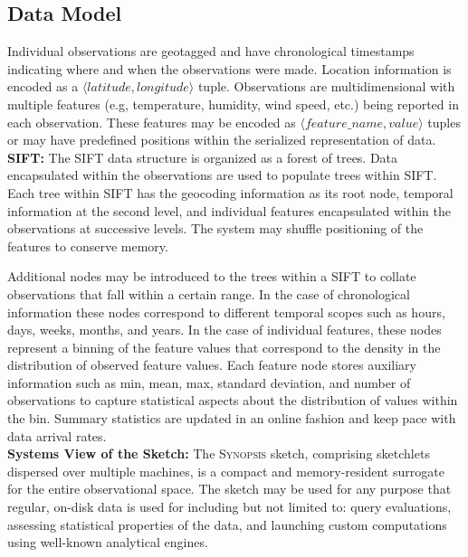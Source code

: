 \subsection{Data Model}
Individual observations are geotagged and have chronological timestamps indicating where and when the observations were made. Location information is encoded as a $\langle latitude, longitude \rangle$ tuple. Observations are multidimensional with multiple features (e.g, temperature, humidity, wind speed, etc.) being reported in each observation. These features may be encoded as $\langle feature\_name, value \rangle$ tuples or may have predefined positions within the serialized representation of data. 
\vspace{0.5em} \\
\textbf{SIFT:} The SIFT data structure is organized as a forest of trees. Data encapsulated within the observations are used to populate trees within SIFT. Each tree within SIFT has the geocoding information as its root node, temporal information at the second level, and individual features encapsulated within the observations at successive levels. The system may shuffle positioning of the features to conserve memory.

Additional nodes may be introduced to the trees within a SIFT to collate observations that fall within a certain range. In the case of chronological information these nodes correspond to different temporal scopes such as hours, days, weeks, months, and years. In the case of individual features, these nodes represent a binning of the feature values that correspond to the density in the distribution of observed feature values. Each feature node stores auxiliary information such as min, mean, max, standard deviation, and number of observations to capture statistical aspects about the distribution of values within the bin. Summary statistics are updated in an online fashion and keep pace with data arrival rates.
%
\vspace{0.5em} \\
\textbf{Systems View of the Sketch:} The \textsc{Synopsis} sketch, comprising sketchlets dispersed over multiple machines, is a compact and memory-resident surrogate for the entire observational space. The sketch may be used for any purpose that regular, on-disk data is used for including but not limited to: query evaluations, assessing statistical properties of the data, and launching custom computations using well-known analytical engines.


